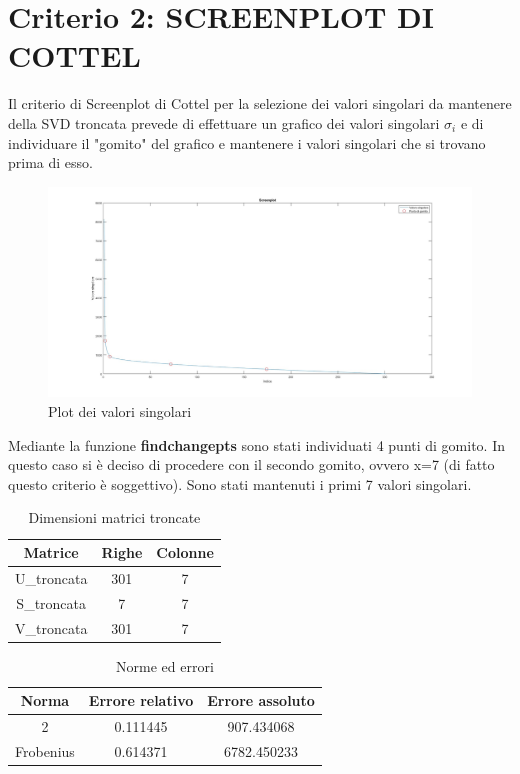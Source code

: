 \section{Criterio 2: SCREENPLOT DI COTTEL}

Il criterio di Screenplot di Cottel per la selezione dei valori singolari da mantenere della SVD troncata prevede di effettuare un grafico dei valori singolari $\sigma_i$ e di individuare il "gomito" del grafico e mantenere i valori singolari che si trovano prima di esso.\\

\begin{figure}[H]
    \centering
     \includegraphics[width=\textwidth]{images/plot.jpg}
    \caption{Plot dei valori singolari}
\end{figure}

\noindent Mediante la funzione \textbf{findchangepts} sono stati individuati 4 punti di gomito. In questo caso si è deciso di procedere con il secondo gomito, ovvero x=7 (di fatto questo criterio è soggettivo).
Sono stati mantenuti i primi 7 valori singolari.\\
\begin{table}[H]
    \centering
    \begin{tabular}{|c|c|c|}
        \hline
        \textbf{Matrice} & \textbf{Righe} & \textbf{Colonne} \\
        \hline
        U\_troncata & 301 & 7 \\
        \hline
        S\_troncata & 7 & 7 \\
        \hline
        V\_troncata & 301 & 7 \\
        \hline
    \end{tabular}
    \caption{Dimensioni matrici troncate}
\end{table}

\begin{table}[H]
    \centering
    \begin{tabular}{|c|c|c|}
        \hline
        \textbf{Norma} & \textbf{Errore relativo} & \textbf{Errore assoluto} \\
        \hline
        2 & 0.111445 & 907.434068 \\
        \hline
        Frobenius & 0.614371 & 6782.450233 \\
        \hline
    \end{tabular}
    \caption{Norme ed errori}
\end{table}

